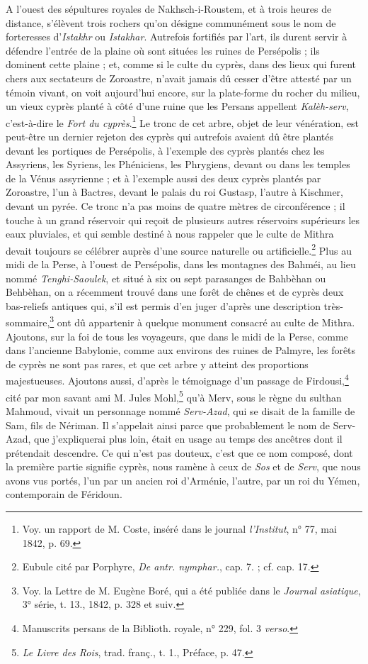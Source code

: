 \documentclass[a4paper, 11pt, oneside, polutonikogreek, french]{article}
\begin{document}
A l'ouest des sépultures royales de Nakhsch-i-Roustem, et à trois heures de distance, s'élèvent trois rochers qu'on désigne communément sous le nom de forteresses d'\emph{Istakhr} ou \emph{Istakhar}. Autrefois fortifiés par l'art, ils durent servir à défendre l'entrée de la plaine où sont situées les ruines de Persépolis ; ils dominent cette plaine ; et, comme si le culte du cyprès, dans des lieux qui furent chers aux sectateurs de Zoroastre, n'avait jamais dû cesser d'être attesté par un témoin vivant, on voit aujourd'hui encore, sur la plate-forme du rocher du milieu, un vieux cyprès planté à côté d'une ruine que les Persans appellent \emph{Kalèh-serv}, c'est-à-dire le \emph{Fort du cyprès}.\footnote{Voy. un rapport de M. Coste, inséré dans le journal \emph{l'Institut}, n° 77, mai 1842, p. 69.} Le tronc de cet arbre, objet de leur vénération, est peut-être un dernier rejeton des cyprès qui autrefois avaient dû être plantés devant les portiques de Persépolis, à l'exemple des cyprès plantés chez les Assyriens, les Syriens, les Phéniciens, les Phrygiens, devant ou dans les temples de la Vénus assyrienne ; et à l'exemple aussi des deux cyprès plantés par Zoroastre, l'un à Bactres, devant le palais du roi Gustasp, l'autre à Kischmer, devant un pyrée. Ce tronc n'a pas moins de quatre mètres de circonférence ; il touche à un grand réservoir qui reçoit de plusieurs autres réservoirs supérieurs les eaux pluviales, et qui semble destiné à nous rappeler que le culte de Mithra devait toujours se célébrer auprès d'une source naturelle ou artificielle.\footnote{Eubule cité par Porphyre, \emph{De antr. nymphar.}, cap. 7. ; cf. cap. 17.} Plus au midi de la Perse, à l'ouest de Persépolis, dans les montagnes des Bahméi, au lieu nommé \emph{Tenghi-Saoulek}, et situé à six ou sept parasanges de Bahbèhan ou Behbèhan, on a récemment trouvé dans une forêt de chênes et de cyprès deux bas-reliefs antiques qui, s'il est permis d'en juger d'après une description très-sommaire,\footnote{Voy. la Lettre de M. Eugène Boré, qui a été publiée dans le \emph{Journal asiatique}, 3° série, t. 13., 1842, p. 328 et suiv.} ont dû appartenir à quelque monument consacré au culte de Mithra. Ajoutons, sur la foi de tous les voyageurs, que dans le midi de la Perse, comme dans l'ancienne Babylonie, comme aux environs des ruines de Palmyre, les forêts de cyprès ne sont pas rares, et que cet arbre y atteint des proportions majestueuses. Ajoutons aussi, d'après le témoignage d'un passage de Firdousi,\footnote{Manuscrits persans de la Biblioth. royale, n° 229, fol. 3 \emph{verso}.} cité par mon savant ami M. Jules Mohl,\footnote{\emph{Le Livre des Rois}, trad. franç., t. 1., Préface, p. 47.} qu'à Merv, sous le règne du sulthan Mahmoud, vivait un personnage nommé \emph{Serv-Azad}, qui se disait de la famille de Sam, fils de Nériman. Il s'appelait ainsi parce que probablement le nom de Serv-Azad, que j'expliquerai plus loin, était en usage au temps des ancêtres dont il prétendait descendre. Ce qui n'est pas douteux, c'est que ce nom composé, dont la première partie signifie cyprès, nous ramène à ceux de \emph{Sos} et de \emph{Serv}, que nous avons vus portés, l'un par un ancien roi d'Arménie, l'autre, par un roi du Yémen, contemporain de Féridoun.
\end{document}
